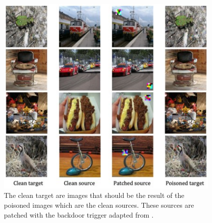 \begin{figure}[ht!]
  \centering
  \includegraphics[width=11cm]{pictures/poisoned_hidden_trigger.jpg}
  \caption{The clean target are images that should be the result of the poisoned images which are the clean sources. These sources are patched with the backdoor trigger adapted from \cite{DBLP:journals/corr/abs-1910-00033}.}
  \label{fig:poisoned_hidden_trigger}
\end{figure}

